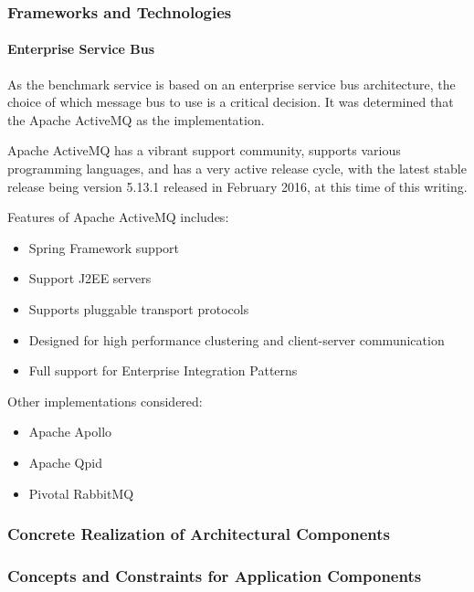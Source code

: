 \subsubsection{Frameworks and Technologies}
\paragraph{Enterprise Service Bus}
As the benchmark service is based on an enterprise service bus architecture,
the choice of which message bus to use is a critical decision. It was determined
that the Apache ActiveMQ as the implementation. 

Apache ActiveMQ has a vibrant support community, supports various programming
languages, and has a very active release cycle, with the latest stable release
being version 5.13.1 released in February 2016, at this time of this writing.

Features of Apache ActiveMQ includes:
\begin{itemize}
	\item Spring Framework support
	\item Support J2EE servers
	\item Supports pluggable transport protocols
	\item Designed for high performance clustering and client-server communication
	\item Full support for Enterprise Integration Patterns
\end{itemize}

Other implementations considered:
\begin{itemize}
	\item Apache Apollo
	\item Apache Qpid
	\item Pivotal RabbitMQ
\end{itemize}

\subsubsection{Concrete Realization of Architectural Components}
\subsubsection{Concepts and Constraints for Application Components}
